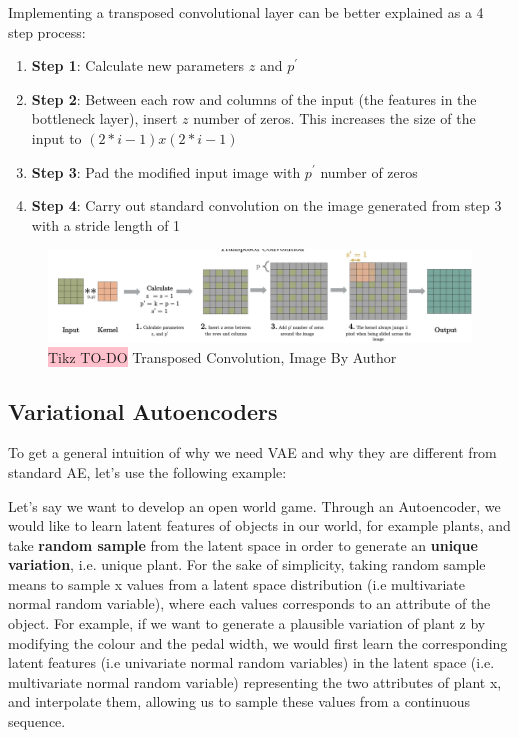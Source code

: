 Implementing a transposed convolutional layer can be better explained as a 4 step process:

\begin{enumerate}
    \item \textbf{Step 1}:  Calculate new parameters $z$ and $p^{'}$
    \item \textbf{Step 2}: Between each row and columns of the input (the features in the bottleneck layer), insert $z$ number of zeros. This increases the size of the input to $(2*i-1)x(2*i-1)$
    \item \textbf{Step 3}: Pad the modified input image with $p^{'}$ number of zeros
    \item  \textbf{Step 4}: Carry out standard convolution on the image generated from step 3 with a stride length of 1
\end{enumerate}

 \begin{figure}[!htbp]
     \centering
     \includegraphics[width=1\linewidth]{tikz/Transposed Convolution.png}
     \caption{{\color{red}\colorbox{pink}{Tikz TO-DO}} Transposed Convolution, Image By Author}
     \label{fig:transposed-convolution}
 \end{figure}



\subsection{Variational Autoencoders}

To get a general intuition of why we need VAE and why they are different from standard AE, let's use the following example:

Let's say we want to develop an open world game. Through an Autoencoder, we would like to learn latent features of objects in our world, for example plants, and take \textbf{random sample} from the latent space in order to generate an \textbf{unique variation}, i.e. unique plant. For the sake of simplicity, taking random sample means to sample x values from a latent space distribution (i.e multivariate normal random variable), where each values corresponds to an attribute of the object.  For example, if we want to generate a plausible variation of plant z by modifying the colour and the pedal width, we would first learn  the corresponding latent features (i.e univariate normal random variables) in the latent space (i.e. multivariate normal random variable) representing the two attributes of plant x, and interpolate them, allowing us to sample these values from a continuous sequence.

